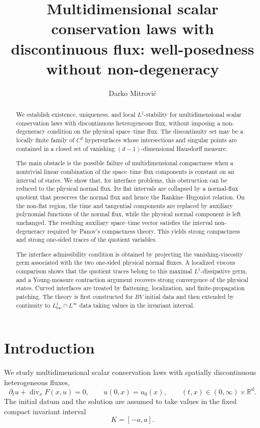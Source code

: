 \documentclass[11pt]{amsart}
\title[Discontinuous fluxes without non-degeneracy]
{Multidimensional scalar conservation laws with discontinuous flux:
well-posedness without non-degeneracy}
\author{Darko Mitrovi\'c}
\numberwithin{equation}{section}
\theoremstyle{plain}
\theoremstyle{definition}
\theoremstyle{remark}
\begin{document}
\begin{abstract}
We establish existence, uniqueness, and local \(L^1\)-stability for
multidimensional scalar conservation laws with discontinuous heterogeneous
flux, without imposing a non-degeneracy condition on the physical
space--time flux. The discontinuity set may be a locally finite family of
\(C^2\) hypersurfaces whose intersections and singular points are contained
in a closed set of vanishing \((d-1)\)-dimensional Hausdorff measure.

The main obstacle is the possible failure of multidimensional compactness
when a nontrivial linear combination of the space--time flux components is
constant on an interval of states. We show that, for interface problems, this
obstruction can be reduced to the physical normal flux. Its flat intervals
are collapsed by a normal-flux quotient that preserves the normal flux and
hence the Rankine--Hugoniot relation. On the non-flat region, the time and
tangential components are replaced by auxiliary polynomial functions of the
normal flux, while the physical normal component is left unchanged. The
resulting auxiliary space--time vector satisfies the interval
non-degeneracy required by Panov's compactness theory. This yields strong
compactness and strong one-sided traces of the quotient variables.

The interface admissibility condition is obtained by projecting the
vanishing-viscosity germ associated with the two one-sided physical normal
fluxes. A localized viscous comparison shows that the quotient traces belong
to this maximal \(L^1\)-dissipative germ, and a Young-measure contraction
argument recovers strong convergence of the physical states. Curved
interfaces are treated by flattening, localization, and finite-propagation
patching. The theory is first constructed for \(BV\) initial data and then
extended by continuity to
\(L^1_{\mathrm{loc}}\cap L^\infty\) data taking values in the invariant
interval.
\end{abstract}

\maketitle

\section{Introduction}

We study multidimensional scalar conservation laws with spatially
discontinuous heterogeneous fluxes,
\begin{equation}\label{eq:intro-main}
    \partial_t u+\operatorname{div}_x F(x,u)=0,
    \qquad
    u(0,x)=u_0(x),
    \qquad
    (t,x)\in(0,\infty)\times\mathbb R^d.
\end{equation}
The initial datum and the solution are assumed to take values in the fixed
compact invariant interval
\[
    K=[-a,a].
\]
\end{document}
